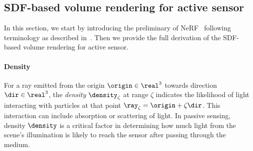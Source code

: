 \clearpage
\subsection{SDF-based volume rendering for active sensor}\label{sec:sup_sdf_vol_render}
In this section, we start by introducing the preliminary of NeRF~\cite{mildenhall2020nerf} following terminology as described in~\cite{tagliasacchi2022volume}. Then we provide the full derivation of the SDF-based volume rendering for active sensor. 

\paragraph{Density}
For a ray emitted from the origin $\origin \in \real^3$ towards direction $\dir \in \real^3$, the \textit{density} $\density_\zeta$ at range $\zeta$ indicates the likelihood of light interacting with particles at that point $\ray_\zeta = \origin + \zeta \dir$. This interaction can include absorption or scattering of light. In passive sensing, density $\density$ is a critical factor in determining how much light from the scene's illumination is likely to reach the sensor after passing through the medium.

